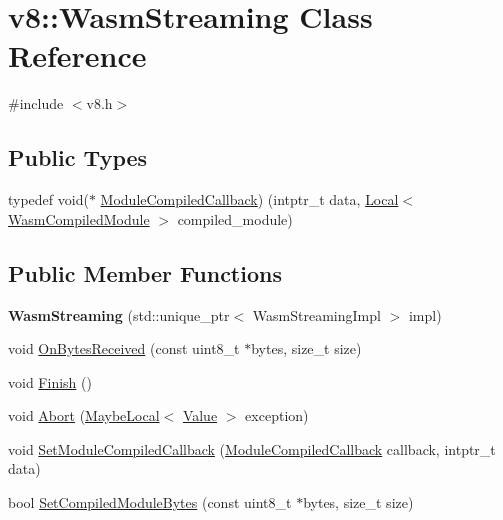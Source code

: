 \hypertarget{classv8_1_1WasmStreaming}{}\section{v8\+:\+:Wasm\+Streaming Class Reference}
\label{classv8_1_1WasmStreaming}


{\ttfamily \#include $<$v8.\+h$>$}

\subsection*{Public Types}
\begin{DoxyCompactItemize}
\item 
typedef void($\ast$ \mbox{\hyperlink{classv8_1_1WasmStreaming_a2e8af849348cbd9fe9c3940ab010917d}{Module\+Compiled\+Callback}}) (intptr\+\_\+t data, \mbox{\hyperlink{classv8_1_1Local}{Local}}$<$ \mbox{\hyperlink{classv8_1_1WasmCompiledModule}{Wasm\+Compiled\+Module}} $>$ compiled\+\_\+module)
\end{DoxyCompactItemize}
\subsection*{Public Member Functions}
\begin{DoxyCompactItemize}
\item 
\mbox{\label{classv8_1_1WasmStreaming_a40fe20bbbe84a244ebd306da4b8ce256}} 
{\bfseries Wasm\+Streaming} (std\+::unique\+\_\+ptr$<$ Wasm\+Streaming\+Impl $>$ impl)
\item 
void \mbox{\hyperlink{classv8_1_1WasmStreaming_ada886a06f191ac65897763bda60c2f54}{On\+Bytes\+Received}} (const uint8\+\_\+t $\ast$bytes, size\+\_\+t size)
\item 
void \mbox{\hyperlink{classv8_1_1WasmStreaming_a2c40c85c34643af871577ea98d792de6}{Finish}} ()
\item 
void \mbox{\hyperlink{classv8_1_1WasmStreaming_aca7399d97368360079e3030b2fb4fc94}{Abort}} (\mbox{\hyperlink{classv8_1_1MaybeLocal}{Maybe\+Local}}$<$ \mbox{\hyperlink{classv8_1_1Value}{Value}} $>$ exception)
\item 
void \mbox{\hyperlink{classv8_1_1WasmStreaming_a3ab2155ed7ae2cce343e634aa46e906b}{Set\+Module\+Compiled\+Callback}} (\mbox{\hyperlink{classv8_1_1WasmStreaming_a2e8af849348cbd9fe9c3940ab010917d}{Module\+Compiled\+Callback}} callback, intptr\+\_\+t data)
\item 
bool \mbox{\hyperlink{classv8_1_1WasmStreaming_a73a233057ae54177e84d259f43a1781e}{Set\+Compiled\+Module\+Bytes}} (const uint8\+\_\+t $\ast$bytes, size\+\_\+t size)
\end{DoxyCompactItemize}
